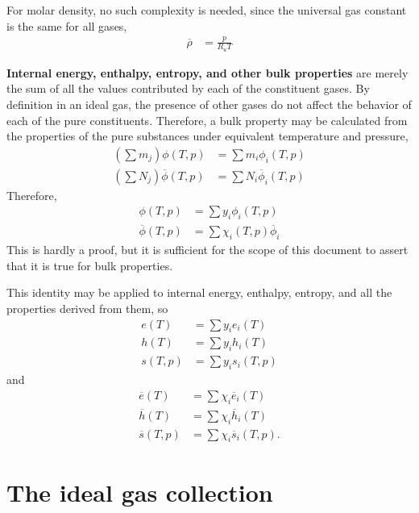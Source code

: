 For molar density, no such complexity is needed, since the universal gas constant is the same for all gases,
\begin{align}
\overline{\rho} &= \frac{p}{R_u T}\nonumber
\end{align}

{\bf Internal energy, enthalpy, entropy, and other bulk properties} are merely the sum of all the values contributed by each of the constituent gases.  By definition in an ideal gas, the presence of other gases do not affect the behavior of each of the pure constituents.  Therefore, a bulk property may be calculated from the properties of the pure substances under equivalent temperature and pressure,
\begin{align}
\left(\sum m_j\right) \phi(T,p) &= \sum m_i \phi_i(T,p)\nonumber\\
\left(\sum N_j \right) \overline{\phi}(T,p) &= \sum N_i \overline{\phi}_i(T,p)\nonumber
\end{align}
Therefore, 
\begin{align}
\phi(T,p) &= \sum y_i \phi_i(T,p)\nonumber\\
\overline{\phi}(T,p) &= \sum \chi_i(T,p) \overline{\phi}_i\nonumber
\end{align}
This is hardly a proof, but it is sufficient for the scope of this document to assert that it is true for bulk properties.

This identity may be applied to internal energy, enthalpy, entropy, and all the properties derived from them, so
\begin{subequations}
\begin{align}
e(T) &= \sum y_i e_i(T)\\
h(T) &= \sum y_i h_i(T)\\
s(T,p) &= \sum y_i s_i(T,p)
\end{align}
\end{subequations}
and
\begin{subequations}
\begin{align}
\overline{e}(T) &= \sum \chi_i \overline{e}_i(T)\\
\overline{h}(T) &= \sum \chi_i \overline{h}_i(T)\\
\overline{s}(T,p) &= \sum \chi_i \overline{s}_i(T,p).
\end{align}
\end{subequations}


\section{The ideal gas collection}

